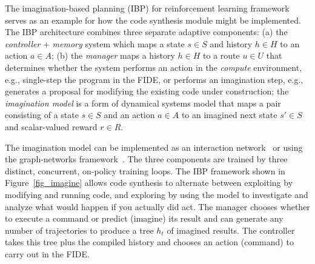 \documentclass[letterpaper,11pt]{article}
\def\urlh#1{{}}
\begin{document}




The imagination-based planning (IBP) for reinforcement learning framework~\cite{PascanuetalCoRR-17} serves as an example for how the code synthesis module might be implemented. The IBP architecture combines three separate adaptive components: (a) the {\it{controller}} + {\it{memory}} system which maps a state $s \in S$ and history $h \in H$ to an action $a \in A$; (b) the {\it{manager}} maps a history $h \in H$ to a route $u \in U$ that determines whether the system performs an action in the {\it{compute}} environment, e.g., single-step the program in the FIDE, or performs an imagination step, e.g., generates a proposal for modifying the existing code under construction; the {\it{imagination model}} is a form of dynamical systems model that maps a pair consisting of a state $s \in S$ and an action $a \in A$ to an imagined next state $s' \in S$ and scalar-valued reward $r \in R$.

The imagination model can be implemented as an interaction network~\cite{BattagliaetalNIPS-16} or using the graph-networks framework~\cite{BattagliaetalCoRR-18,SanchezetalCoRR-18}. The three components are trained by three distinct, concurrent, on-policy training loops. The IBP framework shown in Figure~{\urlh{#Graph_Nets_Imagination_Coding}{\ref{fig_imagine}}} allows code synthesis to alternate between exploiting by modifying and running code, and exploring by using the model to investigate and analyze what would happen if you actually did act. The manager chooses whether to execute a command or predict (imagine) its result and can generate any number of trajectories to produce a tree $h_t$ of imagined results. The controller takes this tree plus the compiled history and chooses an action (command) to carry out in the FIDE.

\end{document}
